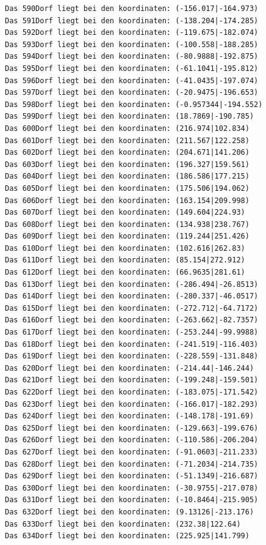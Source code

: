 \documentclass{article}
\begin{document}
\begin{verbatim}
Das 590Dorf liegt bei den koordinaten: (-156.017|-164.973)
Das 591Dorf liegt bei den koordinaten: (-138.204|-174.285)
Das 592Dorf liegt bei den koordinaten: (-119.675|-182.074)
Das 593Dorf liegt bei den koordinaten: (-100.558|-188.285)
Das 594Dorf liegt bei den koordinaten: (-80.9888|-192.875)
Das 595Dorf liegt bei den koordinaten: (-61.1041|-195.812)
Das 596Dorf liegt bei den koordinaten: (-41.0435|-197.074)
Das 597Dorf liegt bei den koordinaten: (-20.9475|-196.653)
Das 598Dorf liegt bei den koordinaten: (-0.957344|-194.552)
Das 599Dorf liegt bei den koordinaten: (18.7869|-190.785)
Das 600Dorf liegt bei den koordinaten: (216.974|102.834)
Das 601Dorf liegt bei den koordinaten: (211.567|122.258)
Das 602Dorf liegt bei den koordinaten: (204.671|141.206)
Das 603Dorf liegt bei den koordinaten: (196.327|159.561)
Das 604Dorf liegt bei den koordinaten: (186.586|177.215)
Das 605Dorf liegt bei den koordinaten: (175.506|194.062)
Das 606Dorf liegt bei den koordinaten: (163.154|209.998)
Das 607Dorf liegt bei den koordinaten: (149.604|224.93)
Das 608Dorf liegt bei den koordinaten: (134.938|238.767)
Das 609Dorf liegt bei den koordinaten: (119.244|251.426)
Das 610Dorf liegt bei den koordinaten: (102.616|262.83)
Das 611Dorf liegt bei den koordinaten: (85.154|272.912)
Das 612Dorf liegt bei den koordinaten: (66.9635|281.61)
Das 613Dorf liegt bei den koordinaten: (-286.494|-26.8513)
Das 614Dorf liegt bei den koordinaten: (-280.337|-46.0517)
Das 615Dorf liegt bei den koordinaten: (-272.712|-64.7172)
Das 616Dorf liegt bei den koordinaten: (-263.662|-82.7357)
Das 617Dorf liegt bei den koordinaten: (-253.244|-99.9988)
Das 618Dorf liegt bei den koordinaten: (-241.519|-116.403)
Das 619Dorf liegt bei den koordinaten: (-228.559|-131.848)
Das 620Dorf liegt bei den koordinaten: (-214.44|-146.244)
Das 621Dorf liegt bei den koordinaten: (-199.248|-159.501)
Das 622Dorf liegt bei den koordinaten: (-183.075|-171.542)
Das 623Dorf liegt bei den koordinaten: (-166.017|-182.293)
Das 624Dorf liegt bei den koordinaten: (-148.178|-191.69)
Das 625Dorf liegt bei den koordinaten: (-129.663|-199.676)
Das 626Dorf liegt bei den koordinaten: (-110.586|-206.204)
Das 627Dorf liegt bei den koordinaten: (-91.0603|-211.233)
Das 628Dorf liegt bei den koordinaten: (-71.2034|-214.735)
Das 629Dorf liegt bei den koordinaten: (-51.1349|-216.687)
Das 630Dorf liegt bei den koordinaten: (-30.9755|-217.078)
Das 631Dorf liegt bei den koordinaten: (-10.8464|-215.905)
Das 632Dorf liegt bei den koordinaten: (9.13126|-213.176)
Das 633Dorf liegt bei den koordinaten: (232.38|122.64)
Das 634Dorf liegt bei den koordinaten: (225.925|141.799)

\end{verbatim}
\end{document}

